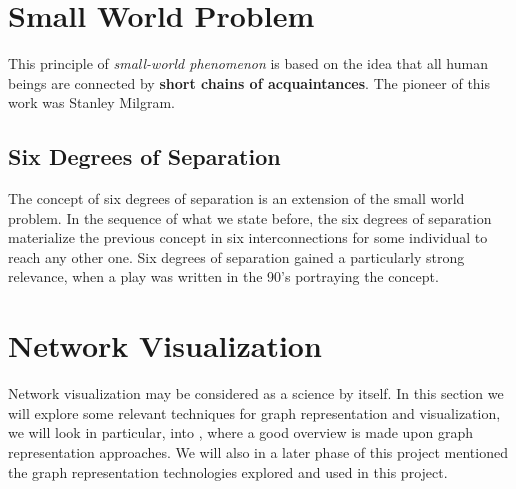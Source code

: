 \section{Small World Problem}
This principle of \textit{small-world phenomenon} is based on the idea that all human beings are connected by \textbf{short chains of acquaintances}. The pioneer of this work was Stanley Milgram.

\subsection*{Six Degrees of Separation}
The concept of six degrees of separation is an extension of the small world problem. In the sequence of what we state before, the six degrees of separation materialize the previous concept in six interconnections for some individual to reach any other one. Six degrees of separation gained a particularly strong relevance, when a play was written in the 90's portraying the concept.

\section{Network Visualization}
Network visualization may be considered as a science by itself. In this section we will explore some relevant techniques for graph representation and visualization, we will look in particular, into \cite{beck2014state}, where a good overview is made upon graph representation approaches. We will also in a later phase of this project mentioned the graph representation technologies explored and used in this project.






